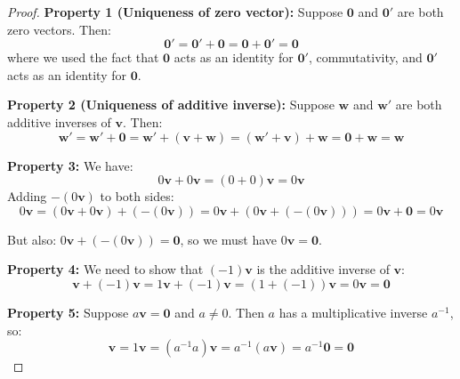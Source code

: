 \documentclass[12pt]{article}
\numberwithin{equation}{section}
\newcommand{\vect}[1]{\boldsymbol{#1}}   %
\theoremstyle{plain}
\theoremstyle{definition}
\theoremstyle{remark}
\begin{document}
\begin{proof}
\textbf{Property 1 (Uniqueness of zero vector):} Suppose $\vect{0}$ and $\vect{0}'$ are both zero vectors. Then:
$$\vect{0}' = \vect{0}' + \vect{0} = \vect{0} + \vect{0}' = \vect{0}$$
where we used the fact that $\vect{0}$ acts as an identity for $\vect{0}'$, commutativity, and $\vect{0}'$ acts as an identity for $\vect{0}$.

\textbf{Property 2 (Uniqueness of additive inverse):} Suppose $\vect{w}$ and $\vect{w}'$ are both additive inverses of $\vect{v}$. Then:
$$\vect{w}' = \vect{w}' + \vect{0} = \vect{w}' + (\vect{v} + \vect{w}) = (\vect{w}' + \vect{v}) + \vect{w} = \vect{0} + \vect{w} = \vect{w}$$

\textbf{Property 3:} We have:
$$0\vect{v} + 0\vect{v} = (0 + 0)\vect{v} = 0\vect{v}$$
Adding $-(0\vect{v})$ to both sides:
$$0\vect{v} = (0\vect{v} + 0\vect{v}) + (-(0\vect{v})) = 0\vect{v} + (0\vect{v} + (-(0\vect{v}))) = 0\vect{v} + \vect{0} = 0\vect{v}$$

But also: $0\vect{v} + (-(0\vect{v})) = \vect{0}$, so we must have $0\vect{v} = \vect{0}$.

\textbf{Property 4:} We need to show that $(-1)\vect{v}$ is the additive inverse of $\vect{v}$:
$$\vect{v} + (-1)\vect{v} = 1\vect{v} + (-1)\vect{v} = (1 + (-1))\vect{v} = 0\vect{v} = \vect{0}$$

\textbf{Property 5:} Suppose $a\vect{v} = \vect{0}$ and $a \neq 0$. Then $a$ has a multiplicative inverse $a^{-1}$, so:
$$\vect{v} = 1\vect{v} = (a^{-1}a)\vect{v} = a^{-1}(a\vect{v}) = a^{-1}\vect{0} = \vect{0}$$
\end{proof}
\end{document}
